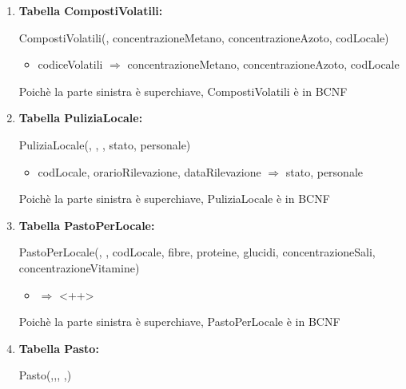 \documentclass[12pt,a4paper]{article}
\begin{document}
\begin{enumerate}
\item[] \textbf{Tabella CompostiVolatili:}

CompostiVolatili(\underline{}, concentrazioneMetano, concentrazioneAzoto,  codLocale)
\begin{itemize}
\vspace{-5pt}
\item codiceVolatili $\Rightarrow$ concentrazioneMetano, concentrazioneAzoto, codLocale
\vspace{-5pt}
\end{itemize}
Poichè la parte sinistra è superchiave, CompostiVolatili è in BCNF
\vspace{10pt}



\item[] \textbf{Tabella PuliziaLocale:}

PuliziaLocale(\underline{}, \underline{}, \underline{}, stato, personale)
\begin{itemize}
\vspace{-5pt}
\item codLocale, orarioRilevazione, dataRilevazione $\Rightarrow$ stato, personale
\vspace{-5pt}
\end{itemize}
Poichè la parte sinistra è superchiave, PuliziaLocale è in BCNF
\vspace{10pt}



\item[] \textbf{Tabella PastoPerLocale:}

PastoPerLocale(\underline{}, \underline{},  codLocale,  fibre,  proteine,  glucidi,  concentrazioneSali,  concentrazioneVitamine)
\begin{itemize}
\vspace{-5pt}
\item <++> $\Rightarrow$ <++>
\vspace{-5pt}
\end{itemize}
Poichè la parte sinistra è superchiave, PastoPerLocale è in BCNF
\vspace{10pt}



\item[] \textbf{Tabella Pasto:}

Pasto(\underline{},\underline{},\underline{}, \underline{},\underline{})


\end{enumerate}
\end{document}
